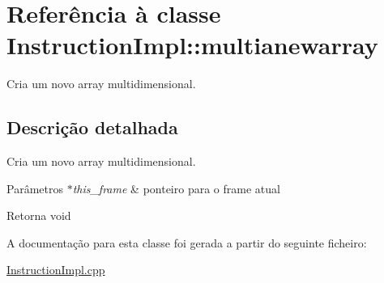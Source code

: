 \hypertarget{class_instruction_impl_1_1multianewarray}{}\section{Referência à classe Instruction\+Impl\+:\+:multianewarray}
\label{class_instruction_impl_1_1multianewarray}


Cria um novo array multidimensional.  




\subsection{Descrição detalhada}
Cria um novo array multidimensional. 


\begin{DoxyParams}{Parâmetros}
{\em $\ast$this\+\_\+frame} & ponteiro para o frame atual \\
\hline
\end{DoxyParams}
\begin{DoxyReturn}{Retorna}
void 
\end{DoxyReturn}


A documentação para esta classe foi gerada a partir do seguinte ficheiro\+:\begin{DoxyCompactItemize}
\item 
\hyperlink{_instruction_impl_8cpp}{Instruction\+Impl.\+cpp}\end{DoxyCompactItemize}
